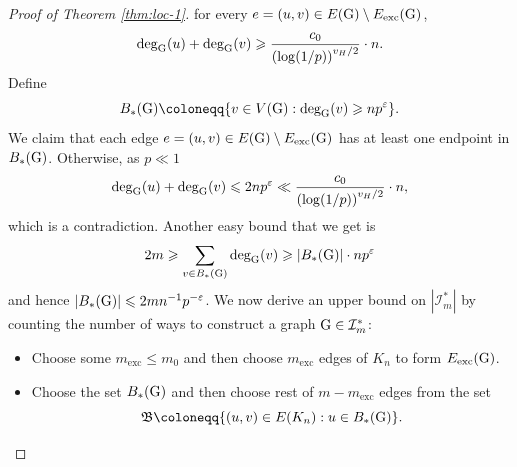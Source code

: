 \documentclass[a4paper,11pt,english,reqno]{amsart}
\numberwithin{equation}{section}
\renewcommand{\leq}{\leqslant}
\renewcommand{\geq}{\geqslant}
\newcommand{\I}{\mathcal{I}}
\newcommand{\uH}{\textup{H}}
\newcommand{\tu}[1]{\textup{#1}}
\begin{document}
\begin{proof}[Proof of Theorem \ref{thm:loc-1}]
				for every $e=(u,v)\in E(\tu{G})\setminus E_{\text{exc}}(\tu{G})$,
				\begin{equation*}
					\text{deg}_{\tu{G}}(u) + \text{deg}_{\tu{G}}(v) \geq \frac{c_{0}}{\left(\log(1/p)\right)^{v_{H}/2}}\cdot n.
				\end{equation*}
				Define 
				\begin{equation*}
					B_{*}(\tu{G}) \coloneqq \{v\in V(\tu{G}): \text{deg}_{\tu{G}}(v)\geq np^{\varepsilon}\}.
				\end{equation*}
				We claim that each edge $e=(u,v)\in E(\tu{G})\setminus E_{\text{exc}}(\tu{G})$ has at least one endpoint in $B_{*}(\tu{G})$. Otherwise, as $p\ll 1$ %
				\begin{equation*}
					\text{deg}_{\tu{G}}(u)+\text{deg}_{\tu{G}}(v)\leq 2np^{\varepsilon}\ll \frac{c_0}{\left(\log(1/p)\right)^{v_{H}/2}}\cdot n,
				\end{equation*}
				which is a contradiction. Another easy bound that we get is 
				\begin{equation*}
					2m \geq \sum_{v\in B_{*}(\tu{G})}\text{deg}_{\tu{G}}(v) \geq |B_{*}(\tu{G})|\cdot np^{\varepsilon}
				\end{equation*}
				and hence $|B_{*}(\tu{G})|\leq 2mn^{-1}p^{-\varepsilon}$. We now derive an upper bound on $|\I^{*}_{m}|$ by counting the number of ways to construct a graph $\tu{G}\in \I^{*}_{m}$:
				\begin{itemize}
					\item[(1)] Choose some $m_{\text{exc}}\leq m_0$ %
					and then choose $m_{\text{exc}}$ edges of $K_{n}$ to form $E_{\text{exc}}(\tu{G})$.
					\item[(2)]Choose the set $B_{*}(\tu{G})$ and then choose rest of $m-m_{\text{exc}}$ edges from the set 
					\begin{equation*}
						\mathfrak{B} \coloneqq \{(u,v)\in E(K_{n}):u\in B_{*}(\tu{G})\}.
					\end{equation*}
				\end{itemize}

\end{proof}
\end{document}
